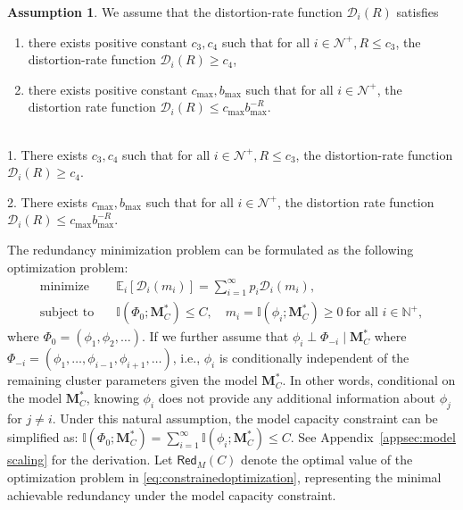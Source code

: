 \documentclass[11pt]{article}
\theoremstyle{plain}
\theoremstyle{definition}
\newtheorem{assumption}[theorem]{Assumption}
\newcommand{\capacity}{C}
\newcommand{\Model}{\boldsymbol{M}}
\newcommand{\ratedistortion}{\mathcal{D}}
\newcommand{\testmodelerror}{\mathsf{Red}_M}
\begin{document}
\begin{assumption}
\label{ass:model scaling}
We assume that the distortion-rate function \( \ratedistortion_i(R) \) satisfies
\begin{arxiv}
    \begin{enumerate}
    \item there exists positive constant $c_3,c_4$ such that for all $i\in \mathcal{N}^+,R\le c_3$, the distortion-rate function $\ratedistortion_i(R)\ge c_4$,
    \item there exists positive constant $c_{\max},b_{\max}$ such that for all $i\in \mathcal{N}^+$, the distortion rate function $\ratedistortion_i(R) \le c_{\max} b_{\max}^{-R}.$
\end{enumerate}
\end{arxiv}
\begin{nips}
\\
    1. There exists $c_3,c_4$ such that for all $i\in \mathcal{N}^+,R\le c_3$, the distortion-rate function $\ratedistortion_i(R)\ge c_4$.
    
    2. There exists $c_{\max},b_{\max}$ such that for all $i\in \mathcal{N}^+$, the distortion rate function $\ratedistortion_i(R) \le c_{\max} b_{\max}^{-R}.$
\end{nips}

\end{assumption}

The redundancy minimization problem can be formulated as the following optimization problem:
\begin{align}
\label{eq:constrainedoptimization}
    \text{minimize} \quad & \mathbb{E}_i[\ratedistortion_i(m_i)] = \sum_{i=1}^{\infty} p_i \ratedistortion_i(m_i),   \\
    \text{subject to} \quad & \mathbb{I}(\Phi_0; \Model^*_\capacity ) \le \capacity, \quad m_i = \mathbb{I}(\phi_i; \Model^*_\capacity) \ge 0 \ \text{for all } i \in \mathbb{N}^+, \nonumber
\end{align}
where \( \Phi_0 = (\phi_1, \phi_2, \ldots) \).
If we further assume that \( \phi_i \perp \Phi_{-i} \mid \Model^*_\capacity \) where \( \Phi_{-i} = (\phi_{1},\ldots, \phi_{i-1}, \phi_{i+1}, \ldots) \), i.e., \( \phi_i \) is conditionally independent of the remaining cluster parameters given the model \( \Model^*_\capacity \).
In other words, conditional on the model \( \Model^*_\capacity \), knowing \(\phi_i\) does not provide any additional information about \(\phi_{j}\) for \(j \neq i\). 
Under this natural assumption, the model capacity constraint can be simplified as:
$
    \mathbb{I}(\Phi_0;  \Model^*_\capacity ) 
    = \sum_{i=1}^{\infty} \mathbb{I}
    (\phi_i;  \Model^*_\capacity ) \leq \capacity. 
$
See Appendix~\ref{appsec:model scaling} for the derivation.
Let \( \testmodelerror(\capacity) \) denote the optimal value of the optimization problem in \eqref{eq:constrainedoptimization}, representing the minimal achievable redundancy under the model capacity constraint.
\end{document}
